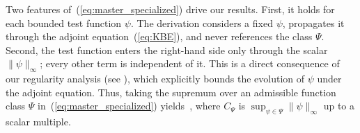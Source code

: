 \documentclass{article} %
\newcommand{\MK}[1]{{\color{brown}{MK: #1}}}
\newtheorem{remark}[theorem]{Remark}
\def\eqref#1{equation~\ref{#1}}
\renewcommand{\eqref}[1]{\textup{(\ref{#1})}}
\begin{document}
Two features of~\eqref{eq:master_specialized} drive our results. First, it holds for each bounded test function $\psi$. The derivation considers a fixed $\psi$, propagates it through the adjoint equation~\eqref{eq:KBE}, and never references the class $\Psi$. Second, the test function enters the right-hand side only through the scalar $\|\psi\|_\infty$; every other term is independent of it. This is a direct consequence of our regularity analysis (see ), which explicitly bounds the evolution of $\psi$ under the adjoint equation. Thus, taking the supremum over an admissible function class $\Psi$ in~\eqref{eq:master_specialized} yields~, where $C_\Psi$ is $\sup_{\psi \in \Psi} \|\psi\|_\infty$ up to a scalar multiple.




\end{document}
